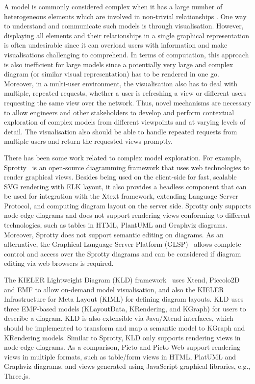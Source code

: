 \documentclass[preprint,12pt, a4paper]{elsarticle}
\begin{document}
A model is commonly considered complex when it has a large number of heterogeneous elements which are involved in non-trivial relationships \cite{boccara2010complex,klosterman2012complex}. One way to understand and communicate such models is through visualisation. However, displaying all elements and their relationships in a single graphical representation is often undesirable since it can overload users with information and make visualisations challenging to comprehend. In terms of computation, this approach is also inefficient for large models since a potentially very large and complex diagram (or similar visual representation) has to be rendered in one go. 
Moreover, in a multi-user environment, the visualisation also has to deal with multiple, repeated requests, whether a user is refreshing a view or different users requesting the same view over the network.
Thus, novel mechanisms are necessary to allow engineers and other stakeholders to develop and perform contextual exploration of complex models from different viewpoints and at varying levels of detail. The visualisation also should be able to handle repeated requests from multiple users and return the requested views promptly.

There has been some work related to complex model exploration. For example, Sprotty~\cite{sprotty2022git} is an open-source diagramming framework that uses web technologies to render graphical views. 
Besides being used on the client-side for fast, scalable SVG rendering with ELK layout, it also provides a headless component that can be used for integration with the Xtext framework, extending Language Server Protocol, and computing diagram layout on the server side. Sprotty only supports node-edge diagrams and does not support rendering views conforming to different technologies, such as tables in HTML, PlantUML and Graphviz diagrams. Moreover, Sprotty does not support semantic editing on diagrams. As an alternative, the Graphical Language Server Platform (GLSP)~\cite{eclipse2022glsp} allows complete control and access over the Sprotty diagrams and can be considered if diagram editing via web browsers is required.

The KIELER Lightweight Diagram (KLD) framework~\cite{schneider2013just} uses Xtend, Piccolo2D and EMF to allow on-demand model visualisation, and also the KIELER Infrastructure for Meta Layout (KIML) for defining diagram layouts. KLD uses three EMF-based models (KLayoutData, KRendering, and KGraph) for users to describe a diagram. KLD is also extensible via Java/Xtend interfaces, which should be implemented to transform and map a semantic model to KGraph and KRendering models. Similar to Sprotty, KLD only supports rendering views in node-edge diagrams. As a comparison, Picto and Picto Web support rendering views in multiple formats, such as table/form views in HTML, PlatUML and Graphviz diagrams, and views generated using JavaScript graphical libraries, e.g., Three.js.
\end{document}
